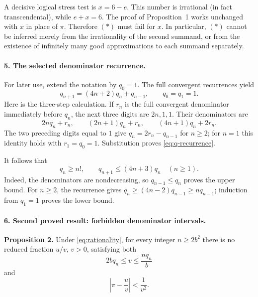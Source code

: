 \documentclass[11pt]{article}
\begin{document}
A decisive logical stress test is $x=6-e$. This number is irrational
(in fact transcendental), while $e+x=6$. The proof of Proposition~1 works
unchanged with $x$ in place of $\pi$. Therefore $(*)$ must fail for $x$.
In particular, $(*)$ cannot be inferred merely from the irrationality of
the second summand, or from the existence of infinitely many good
approximations to each summand separately.

\paragraph{5. The selected denominator recurrence.}
For later use, extend the notation by $q_0=1$. The full convergent
recurrences yield
\begin{equation}\label{eq:q-recurrence}
 \boxed{q_{n+1}=(4n+2)q_n+q_{n-1},\qquad q_0=q_1=1.}
\end{equation}
Here is the three-step calculation. If $r_n$ is the full convergent
denominator immediately before $q_n$, the next three digits are $2n,1,1$.
Their denominators are
\[
 2nq_n+r_n,\qquad (2n+1)q_n+r_n,\qquad (4n+1)q_n+2r_n.
\]
The two preceding digits equal to $1$ give $q_n=2r_n-q_{n-1}$ for $n\ge2$;
for $n=1$ this identity holds with $r_1=q_0=1$. Substitution proves
\eqref{eq:q-recurrence}.

It follows that
\begin{equation}\label{eq:q-bounds}
 q_n\ge n!,\qquad q_{n+1}\le(4n+3)q_n\quad(n\ge1).
\end{equation}
Indeed, the denominators are nondecreasing, so $q_{n-1}\le q_n$ proves the
upper bound. For $n\ge2$, the recurrence gives
$q_n\ge(4n-2)q_{n-1}\ge n q_{n-1}$; induction from $q_1=1$ proves
the lower bound.

\paragraph{6. Second proved result: forbidden denominator intervals.}
\textbf{Proposition 2.} Under \eqref{eq:rationality}, for every integer
$n\ge2b^2$ there is no reduced fraction $u/v$, $v>0$, satisfying both
\begin{equation}\label{eq:forbidden-range}
 2bq_n\le v\le\frac{nq_n}{b}
\end{equation}
and
\begin{equation}\label{eq:good-pi}
 \left|\pi-\frac uv\right|<\frac1{v^2}.
\end{equation}
\end{document}
